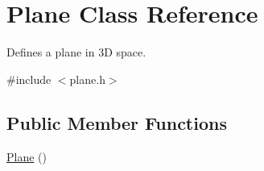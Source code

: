 \hypertarget{class_plane}{\section{Plane Class Reference}
\label{class_plane}
}


Defines a plane in 3\-D space.  




{\ttfamily \#include $<$plane.\-h$>$}

\subsection*{Public Member Functions}
\begin{DoxyCompactItemize}
\item 
\hypertarget{class_plane_acac0d9c003e0ab10d07b146c3566a0c7}{\hyperlink{class_plane_acac0d9c003e0ab10d07b146c3566a0c7}{Plane} ()}\label{class_plane_acac0d9c003e0ab10d07b146c3566a0c7}


\end{DoxyCompactItemize}
